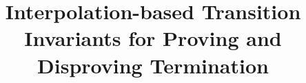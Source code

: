 \documentclass[runningheads]{llncs}
\newif\ifbadgeavailable\newif\ifbadgefunctional\newif\ifbadgereusable
\theoremstyle{definition}
\begin{document}

\title{Interpolation-based Transition Invariants for Proving and Disproving Termination}

%
%

\author{}
\institute{}



    


%
\end{document}
